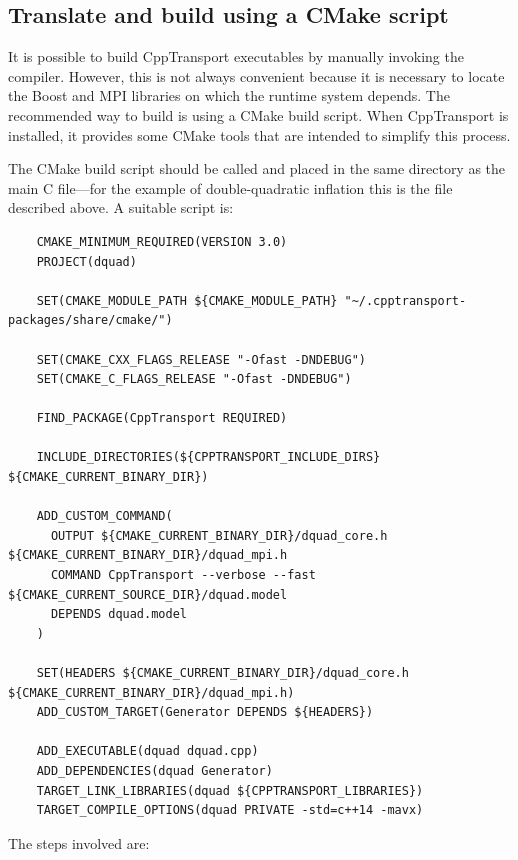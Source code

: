 \documentclass[11pt,a4paper]{article}
\renewcommand{\texttt}[1]{{\ttfamily\fontseries{l}\selectfont{#1}}}
\newcommand{\packagefont}{\sffamily}
\newcommand{\CppTransport}{{\packagefont CppTransport}}
\newcommand{\MPI}{{\packagefont MPI}}
\newcommand{\Boost}{{\packagefont Boost}}
\newcommand{\CMake}{{\packagefont CMake}}
\newcommand{\file}[1]{\texttt{{#1}}}
\newcommand\CC{C\nolinebreak\hspace{-.05em}\raisebox{.4ex}{\relsize{-3}{\textbf{+}}}\nolinebreak\hspace{-.10em}\raisebox{.4ex}{\relsize{-3}{\textbf{+}}}}
\begin{document}
\subsection{Translate and build using a {\CMake} script}
It is possible to build {\CppTransport} executables by manually invoking the
compiler.
However, this
is not always convenient because it is necessary to locate the
{\Boost} and {\MPI}
libraries on which the runtime system depends.
The recommended way to build is using a {\CMake} build script.
When {\CppTransport} is installed, it provides some
{\CMake} tools that are intended to simplify this process.

The {\CMake} build script should be called \file{CMakeLists.txt} and
placed in the same directory as the
main {\CC} file---for the example of double-quadratic
inflation this is the file \file{dquad.mpi}
described above. A suitable script is:
\begin{verbatim}
    CMAKE_MINIMUM_REQUIRED(VERSION 3.0)
    PROJECT(dquad)
    
    SET(CMAKE_MODULE_PATH ${CMAKE_MODULE_PATH} "~/.cpptransport-packages/share/cmake/")
    
    SET(CMAKE_CXX_FLAGS_RELEASE "-Ofast -DNDEBUG")
    SET(CMAKE_C_FLAGS_RELEASE "-Ofast -DNDEBUG")
    
    FIND_PACKAGE(CppTransport REQUIRED)
    
    INCLUDE_DIRECTORIES(${CPPTRANSPORT_INCLUDE_DIRS} ${CMAKE_CURRENT_BINARY_DIR})
    
    ADD_CUSTOM_COMMAND(
      OUTPUT ${CMAKE_CURRENT_BINARY_DIR}/dquad_core.h ${CMAKE_CURRENT_BINARY_DIR}/dquad_mpi.h
      COMMAND CppTransport --verbose --fast ${CMAKE_CURRENT_SOURCE_DIR}/dquad.model
      DEPENDS dquad.model
    )
    
    SET(HEADERS ${CMAKE_CURRENT_BINARY_DIR}/dquad_core.h ${CMAKE_CURRENT_BINARY_DIR}/dquad_mpi.h)
    ADD_CUSTOM_TARGET(Generator DEPENDS ${HEADERS})
    
    ADD_EXECUTABLE(dquad dquad.cpp)
    ADD_DEPENDENCIES(dquad Generator)
    TARGET_LINK_LIBRARIES(dquad ${CPPTRANSPORT_LIBRARIES})
    TARGET_COMPILE_OPTIONS(dquad PRIVATE -std=c++14 -mavx)
\end{verbatim}
The steps involved are:
\end{document}

